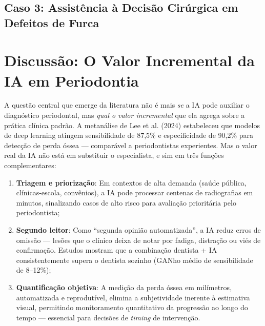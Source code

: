 \subsection{Caso 3: Assistência à Decisão Cirúrgica em Defeitos de Furca}


\section{Discussão: O Valor Incremental da IA em Periodontia}

A questão central que emerge da literatura não é mais \textit{se} a IA pode auxiliar o diagnóstico periodontal, mas \textit{qual o valor incremental} que ela agrega sobre a prática clínica padrão. A metanálise de Lee et al. (2024) estabeleceu que modelos de deep learning atingem sensibilidade de 87,5\% e especificidade de 90,2\% para detecção de perda óssea --- comparável a periodontistas experientes. Mas o valor real da IA não está em substituir o especialista, e sim em três funções complementares:

\begin{enumerate}
    \item \textbf{Triagem e priorização}: Em contextos de alta demanda (saúde pública, clínicas-escola, convênios), a IA pode processar centenas de radiografias em minutos, sinalizando casos de alto risco para avaliação prioritária pelo periodontista;

    \item \textbf{Segundo leitor}: Como ``segunda opinião automatizada'', a IA reduz erros de omissão --- lesões que o clínico deixa de notar por fadiga, distração ou viés de confirmação. Estudos mostram que a combinação dentista + IA consistentemente supera o dentista sozinho (GANho médio de sensibilidade de 8--12\%);

    \item \textbf{Quantificação objetiva}: A medição da perda óssea em milímetros, automatizada e reprodutível, elimina a subjetividade inerente à estimativa visual, permitindo monitoramento quantitativo da progressão ao longo do tempo --- essencial para decisões de \textit{timing} de intervenção.
\end{enumerate}

